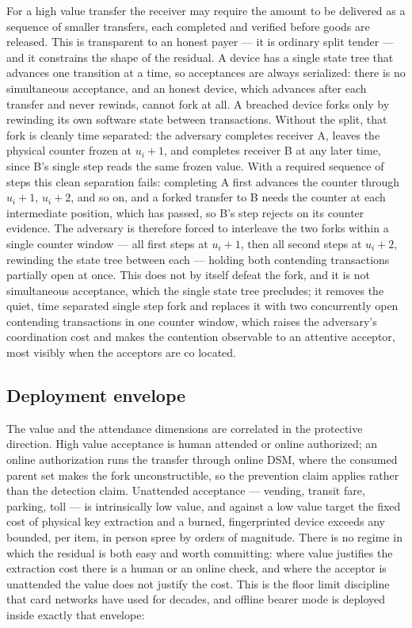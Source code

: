 \documentclass[11pt]{article}
\theoremstyle{definition}
\theoremstyle{remark}
\begin{document}
For a high value transfer the receiver may require the amount to be delivered as a sequence of smaller
transfers, each completed and verified before goods are released. This is transparent to an honest
payer --- it is ordinary split tender --- and it constrains the shape of the residual. A device has a
single state tree that advances one transition at a time, so acceptances are always serialized: there
is no simultaneous acceptance, and an honest device, which advances after each transfer and never
rewinds, cannot fork at all. A breached device forks only by rewinding its own software state between
transactions. Without the split, that fork is cleanly time separated: the adversary completes receiver
A, leaves the physical counter frozen at \(u_i+1\), and completes receiver B at any later time, since
B's single step reads the same frozen value. With a required sequence of steps this clean separation
fails: completing A first advances the counter through \(u_i+1\), \(u_i+2\), and so on, and a forked
transfer to B needs the counter at each intermediate position, which has passed, so B's step rejects
on its counter evidence. The adversary is therefore forced to interleave the two forks within a single
counter window --- all first steps at \(u_i+1\), then all second steps at \(u_i+2\), rewinding the
state tree between each --- holding both contending transactions partially open at once. This does not
by itself defeat the fork, and it is not simultaneous acceptance, which the single state tree
precludes; it removes the quiet, time separated single step fork and replaces it with two concurrently
open contending transactions in one counter window, which raises the adversary's coordination cost and
makes the contention observable to an attentive acceptor, most visibly when the acceptors are co
located.

\subsection{Deployment envelope}

The value and the attendance dimensions are correlated in the protective direction. High value
acceptance is human attended or online authorized; an online authorization runs the transfer through
online DSM, where the consumed parent set makes the fork unconstructible, so the prevention claim
applies rather than the detection claim. Unattended acceptance --- vending, transit fare, parking,
toll --- is intrinsically low value, and against a low value target the fixed cost of physical key
extraction and a burned, fingerprinted device exceeds any bounded, per item, in person spree by orders
of magnitude. There is no regime in which the residual is both easy and worth committing: where value
justifies the extraction cost there is a human or an online check, and where the acceptor is
unattended the value does not justify the cost. This is the floor limit discipline that card networks
have used for decades, and offline bearer mode is deployed inside exactly that envelope:
\end{document}
